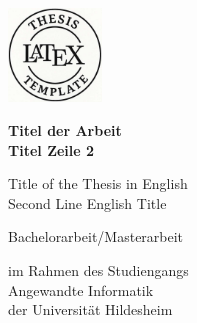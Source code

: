 \documentclass[11pt,        %
  english,ngerman,          %
  paper=a4,                 %
  captions=tablesignature,  %
  listof=numbered,          %
  bibliography=totoc,       %
  headings=small,           %
  headinclude=false,        %
  footinclude=false,        %
  parskip=half-,            %
  oneside,                  %
  BCOR=15mm,                 %
  DIV=12                    %
  ]{scrbook}                %
\begin{document}
\frontmatter



\begin{titlepage}
  \begin{center}
    \includegraphics[width=2.5cm]{figures/logo.pdf}\\

    \vfill

    {
      \Large
      \bfseries
      Titel der Arbeit\\    
      Titel Zeile 2
      
      \vspace{0.25cm}
      \normalsize
      \mdseries
        Title of the Thesis in English\\
        Second Line English Title
    }

    \vfill

    {
      \normalsize

      Bachelorarbeit/Masterarbeit

      im Rahmen des Studiengangs\\
      Angewandte Informatik\\
      der Universität Hildesheim

}
\end{center}
\end{titlepage}
\end{document}

